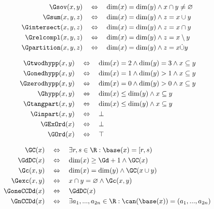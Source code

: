 \begin{satz}
    \begin{align*}
        \Gsov(x,y) \quad &\Leftrightarrow \quad \dim(x)=\dim(y) \land x \cap y \neq \varnothing \\
        \Gsum(x,y,z) \quad &\Leftrightarrow \quad \dim(x) = \dim(y) \land z = x \cup y \\
        \Gintersect(x,y,z) \quad &\Leftrightarrow \quad \dim(x) = \dim(y) \land z = x \cap y \\
        \Grelcompl(x,y,z) \quad &\Leftrightarrow \quad \dim(x) = \dim(y) \land z = x \setminus y \\
        \Gpartition(x,y,z) \quad &\Leftrightarrow \quad \dim(x) = \dim(y) \land z = x \dot{\cup} y
    \end{align*}
\end{satz}

\begin{satz}
    \begin{align*}
        \Gtwodhypp(x,y) \quad &\Leftrightarrow \quad \dim(x)=2 \land \dim(y)=3 \land x \subseteq y \\
        \Gonedhypp(x,y) \quad &\Leftrightarrow \quad \dim(x)=1 \land \dim(y) > 1 \land x \subseteq y \\
        \Gzerodhypp(x,y) \quad &\Leftrightarrow \quad \dim(x)=0 \land \dim(y) > 0 \land x \subseteq y \\
        \Ghypp(x,y) \quad &\Leftrightarrow \quad \dim(x) \leq \dim(y) \land x \subseteq y \\
        \Gtangpart(x,y) \quad &\Leftrightarrow \quad \dim(x) \leq \dim(y) \land x \subseteq y \\
        \Ginpart(x,y) \quad &\Leftrightarrow \quad \bot \\
        \GExOrd(x) \quad &\Leftrightarrow \quad \bot \\
        \GOrd(x) \quad &\Leftrightarrow \quad \top
    \end{align*}
\end{satz}

\begin{satz}
    \begin{align*}
        \GC(x) \quad &\Leftrightarrow \quad \exists r,s \in \R: \base(x) = [r,s) \\
        \GdDC(x) \quad &\Leftrightarrow \quad \dim(x) \geq \Gd+1 \land \GC(x) \\
        \Gc(x,y) \quad &\Leftrightarrow \quad \dim(x)=\dim(y) \land \GC(x \cup y) \\
        \Gexc(x,y) \quad &\Leftrightarrow \quad x \cap y = \varnothing \land \Gc(x,y) \\
        \GoneCCDd(x) \quad &\Leftrightarrow \quad \GdDC(x) \\
        \GnCCDd(x) \quad &\Leftrightarrow \quad \exists a_1, ... , a_{2n} \in \R: \can(\base(x)) = (a_1, ..., a_{2n})
    \end{align*}
\end{satz}

